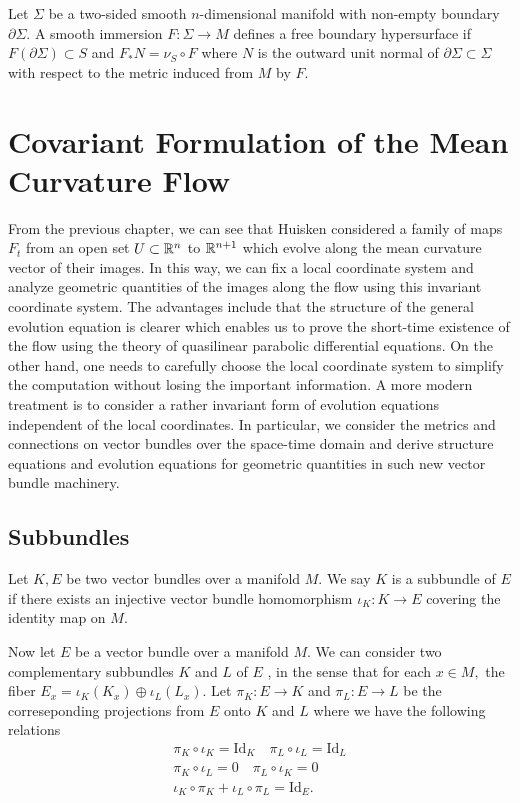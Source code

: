Let $\Sigma $ be a two-sided smooth $n$-dimensional manifold with non-empty boundary $\partial \Sigma $. A smooth immersion $F : \Sigma \to  M$ defines a free boundary hypersurface if $F(\partial \Sigma ) \subset S$ and $F_* N = \nu _S \circ F$ where $N$ is the outward unit normal of $\partial \Sigma \subset \Sigma $ with respect to the metric induced from $M$ by $F$.




\section{Covariant Formulation of the Mean Curvature Flow}

From the previous chapter, we can see that Huisken considered a family of maps $F_t$ from an open set $U \subset \mathbb{R}^n$ to $\mathbb{R}^{n+1}$ which evolve along the mean curvature vector of their images. In this way, we can fix a local coordinate system and analyze geometric quantities of the images along the flow using this invariant coordinate system. The advantages include that the structure of the general evolution equation is clearer which enables us to prove the short-time existence of the flow using the theory of quasilinear parabolic differential equations. On the other hand, one needs to carefully choose the local coordinate system to simplify the computation without losing the important information. A more modern treatment is to consider a rather invariant form of evolution equations independent of the local coordinates. In particular, we consider the metrics and connections on vector bundles over the space-time domain and derive structure equations and evolution equations for geometric quantities in such new vector bundle machinery.

\subsection{Subbundles}

\begin{definition}
    Let $K, E$ be two vector bundles over a manifold $M$. We say $K$ is a subbundle of $E$ if there exists an injective vector bundle homomorphism $\iota_K : K \to E$ covering the identity map on $M$.
\end{definition}

Now let $E$ be a vector bundle over a manifold $M$. We can consider two complementary subbundles $K$ and $L$ of $E$ , in the sense that for each $x \in M,$ the fiber $E_x=\iota_K(K_x) \oplus \iota_L(L_x)$. Let $\pi _K : E \to K$ and $\pi _L : E \to L$ be the correseponding projections from $E$ onto $K$ and $L$ where we have the following relations
\begin{gather*}
    \pi _K \circ \iota _K= \mathrm{Id}_K \quad \pi _L \circ \iota _L=\mathrm{Id}_L\\
    \pi _K \circ \iota _L=0 \quad \pi _L \circ \iota _K=0\\
    \iota _K \circ \pi _K + \iota _L \circ \pi _L = \mathrm{Id}_E.
\end{gather*}

